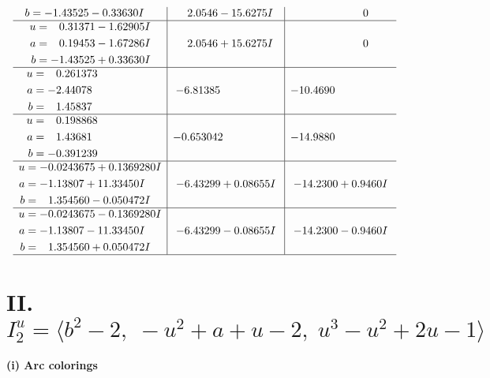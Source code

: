 \documentclass[1p]{elsarticle_modified}
\theoremstyle{definition}
\begin{document}
$$\begin{array}{c|c|c}
\begin{aligned}
b &= -1.43525 - 0.33630 I\end{aligned}
 & \phantom{-}2.0546 - 15.6275 I & \phantom{-0.000000 } 0 \\ \hline\begin{aligned}
u &= \phantom{-}0.31371 - 1.62905 I \\
a &= \phantom{-}0.19453 - 1.67286 I \\
b &= -1.43525 + 0.33630 I\end{aligned}
 & \phantom{-}2.0546 + 15.6275 I & \phantom{-0.000000 } 0 \\ \hline\begin{aligned}
u &= \phantom{-}0.261373\phantom{ +0.000000I} \\
a &= -2.44078\phantom{ +0.000000I} \\
b &= \phantom{-}1.45837\phantom{ +0.000000I}\end{aligned}
 & -6.81385\phantom{ +0.000000I} & -10.4690\phantom{ +0.000000I} \\ \hline\begin{aligned}
u &= \phantom{-}0.198868\phantom{ +0.000000I} \\
a &= \phantom{-}1.43681\phantom{ +0.000000I} \\
b &= -0.391239\phantom{ +0.000000I}\end{aligned}
 & -0.653042\phantom{ +0.000000I} & -14.9880\phantom{ +0.000000I} \\ \hline\begin{aligned}
u &= -0.0243675 + 0.1369280 I \\
a &= -1.13807 + 11.33450 I \\
b &= \phantom{-}1.354560 - 0.050472 I\end{aligned}
 & -6.43299 + 0.08655 I & -14.2300 + 0.9460 I \\ \hline\begin{aligned}
u &= -0.0243675 - 0.1369280 I \\
a &= -1.13807 - 11.33450 I \\
b &= \phantom{-}1.354560 + 0.050472 I\end{aligned}
 & -6.43299 - 0.08655 I & -14.2300 - 0.9460 I\\
 \hline 
 \end{array}$$\newpage\newpage\renewcommand{\arraystretch}{1}
\centering \section*{II. $I^u_{2}= \langle b^2-2,\;- u^2+a+u-2,\;u^3- u^2+2 u-1 \rangle$}
\flushleft \textbf{(i) Arc colorings}\\
\end{document}
